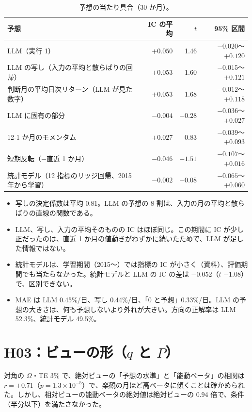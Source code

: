 \documentclass[xelatex,ja=standard,jafont=haranoaji,a4paper,10pt,openany]{bxjsreport}
\begin{document}
\begin{table}[htbp]
\centering
\caption{予想の当たり具合（30 か月）。}
\small
\begin{tabular}{lrrr}
\toprule
予想 & IC の平均 & $t$ & 95\% 区間 \\
\midrule
LLM（実行 1） & $+0.050$ & 1.46 & $-0.020$〜$+0.120$ \\
LLM の写し（入力の平均と散らばりの回帰） & $+0.053$ & 1.60 & $-0.015$〜$+0.121$ \\
判断月の平均日次リターン（LLM が見た数字） & $+0.053$ & 1.68 & $-0.012$〜$+0.118$ \\
LLM に固有の部分 & $-0.004$ & $-0.28$ & $-0.036$〜$+0.027$ \\
12-1 か月のモメンタム & $+0.027$ & 0.83 & $-0.039$〜$+0.093$ \\
短期反転（$-$直近 1 か月） & $-0.046$ & $-1.51$ & $-0.107$〜$+0.016$ \\
統計モデル（12 指標のリッジ回帰、2015 年から学習） & $-0.002$ & $-0.08$ & $-0.065$〜$+0.060$ \\
\bottomrule
\end{tabular}
\end{table}

\begin{itemize}
\item 写しの決定係数は平均 0.81。LLM の予想の 8 割は、入力の月の平均と散らばりの直線の関数である。
\item LLM、写し、入力の平均そのものの IC はほぼ同じ。この期間に IC が少し正だったのは、直近 1 か月の値動きがわずかに続いたためで、LLM が足した情報ではない。
\item 統計モデルは、学習期間（2015〜）では指標の IC が小さく（資料）、評価期間でも当たらなかった。統計モデルと LLM の IC の差は $-0.052$（$t$ $-1.08$）で、区別できない。
\item MAE は LLM 0.45\%/日、写し 0.44\%/日、「0 と予想」0.33\%/日。LLM の予想の大きさは、何も予想しないより外れが大きい。方向の正解率は LLM 52.3\%、統計モデル 49.5\%。
\end{itemize}

\chapter{H03：ビューの形（$q$ と $P$）}\label{ch:h03}

\begin{verdict}[判定：支持されなかった]
対角の $\Omega$・TE 3\% で、絶対ビューの「予想の水準」と「能動ベータ」の相関は $r=+0.71$（$p=1.3\times10^{-5}$）で、楽観の月ほど高ベータに傾くことは確かめられた。しかし、相対ビューの能動ベータの絶対値は絶対ビューの 0.94 倍で、条件（半分以下）を満たさなかった。
\end{verdict}
\end{document}
